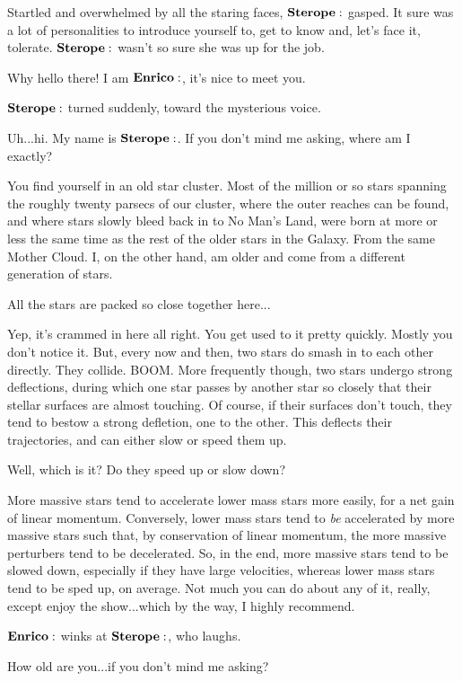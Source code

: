 Startled and overwhelmed by all the staring faces, $\Sterope$ gasped.  It sure was a lot of personalities to introduce yourself to, get to know and, let's face it, tolerate.  $\Sterope$ wasn't so sure she was up for the job.

\Enrico Why hello there!  I am $\Enrico$, it's nice to meet you.

$\Sterope$ turned suddenly, toward the mysterious voice.

\Sterope Uh...hi.  My name is $\Sterope$.  If you don't mind me asking, where am I exactly?

\Enrico You find yourself in an old star cluster.  Most of the million or so stars spanning the roughly twenty parsecs of our cluster, where the outer reaches can be found, and where stars slowly bleed back in to No Man's Land, were born at more or less the same time as the rest of the older stars in the Galaxy.  From the same Mother Cloud.  I, on the other hand, am older and come from a different generation of stars.  

\Sterope All the stars are packed so close together here...

\Enrico Yep, it's crammed in here all right.  You get used to it pretty quickly.  Mostly you don't notice it.  But, every now and then, two stars do smash in to each other directly.  They collide.  BOOM.  More frequently though, two stars undergo strong deflections, during which one star passes by another star so closely that their stellar surfaces are almost touching.  Of course, if their surfaces don't touch, they tend to bestow a strong defletion, one to the other.  This deflects their trajectories, and can either slow or speed them up.  

\Sterope Well, which is it?  Do they speed up or slow down?

\Enrico More massive stars tend to accelerate lower mass stars more easily, for a net gain of linear momentum. Conversely, lower mass stars tend to \textit{be} accelerated by more massive stars such that, by conservation of linear momentum, the more massive perturbers tend to be decelerated. So, in the end, more massive stars tend to be slowed down, especially if they have large velocities, whereas lower mass stars tend to be sped up, on average.  Not much you can do about any of it, really, except enjoy the show...which by the way, I highly recommend.

$\Enrico$ winks at $\Sterope$, who laughs.

\Sterope How old are you...if you don't mind me asking?

